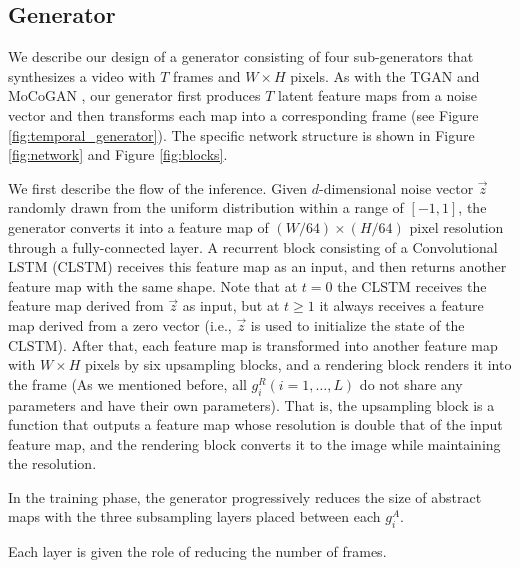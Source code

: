\documentclass[twocolumn]{svjour3}
\def\Fig#1{Figure \ref{fig:#1}}
\begin{document}
\subsection{Generator}
\label{sec:generator_architecture}
We describe our design of a generator consisting of four sub-generators that synthesizes a video with $T$ frames and $W \times H$ pixels.
As with the TGAN \cite{Saito2017} and MoCoGAN \cite{Tulyakov2018},
our generator first produces $T$ latent feature maps from a noise vector and then transforms each map into a corresponding frame (see \Fig{temporal_generator}).
The specific network structure is shown in \Fig{network} and \Fig{blocks}.

We first describe the flow of the inference. Given $d$-dimensional noise vector
$\vec{z}$ randomly drawn from the uniform distribution within a range of $[-1, 1]$,
the generator converts it into a feature map of $(W / 64) \times (H / 64)$ pixel resolution through a fully-connected layer.
A recurrent block consisting of a Convolutional LSTM \cite{Shi2015} (CLSTM) receives this feature map as an input,
and then returns another feature map with the same shape.
Note that at $t=0$ the CLSTM receives the feature map derived from $\vec{z}$ as input,
but at $t \geq 1$ it always receives a feature map derived from a zero vector
(i.e., $\vec{z}$ is used to initialize the state of the CLSTM).
After that, each feature map is transformed into another feature map with $W \times H$ pixels by six upsampling blocks, and a rendering block renders it into the frame
(As we mentioned before, all $g_i^R (i=1,\dots,L)$ do not share any parameters and have their own parameters).
That is, the upsampling block is a function that outputs a feature map whose resolution is double that of the input feature map, and the rendering block converts it to the image while maintaining the resolution.

In the training phase, the generator progressively reduces the size of abstract maps
with the three subsampling layers placed between each $g^A_i$.

Each layer is given the role of reducing the number of frames.
\end{document}
